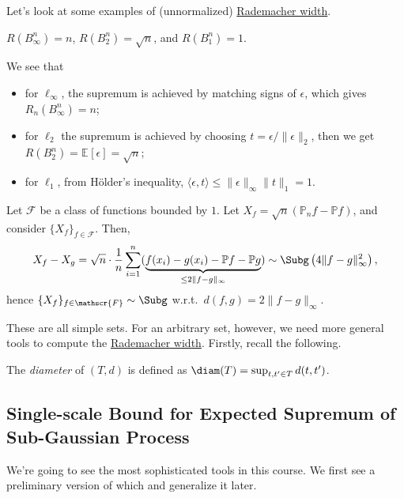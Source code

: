 Let's look at some examples of (unnormalized) \hyperref[def:Rademacher-width]{Rademacher width}.

\begin{eg}
	\(R(B_\infty ^n) = n\), \(R(B_2^n)= \sqrt{n} \), and \(R(B_1^n) = 1\).
\end{eg}
\begin{explanation}
	We see that
	\begin{itemize}
		\item for \(\ell _\infty \), the supremum is achieved by matching signs of \(\epsilon \), which gives \(R_n(B_\infty ^n) = n\);
		\item for \(\ell _2\) the supremum is achieved by choosing \(t = \epsilon / \lVert \epsilon \rVert _2\), then we get \(R(B_2^n) = \mathbb{E}_{}\left[\epsilon \right] = \sqrt{n} \);
		\item for \(\ell _1\), from Hölder's inequality, \(\langle \epsilon , t \rangle \leq \lVert \epsilon \rVert _\infty \lVert t \rVert _1 = 1\).
	\end{itemize}
\end{explanation}

\begin{eg}\label{eg:supremum-of-empirical-process}
	Let \(\mathscr{F} \) be a class of functions bounded by \(1\). Let \(X_f = \sqrt{n} (\mathbb{P} _n f - \mathbb{P} f)\), and consider \(\{ X_f \}_{f\in \mathscr{F} } \). Then,
	\[
		X_f - X_g
		= \sqrt{n} \cdot \frac{1}{n}\sum_{i=1}^{n} ( \underbrace{f(x_i) - g(x_i) - \mathbb{P} f - \mathbb{P} g }_{\leq 2 \lVert f-g \rVert _\infty })
		\sim \Subg\left( 4 \lVert f - g \rVert _\infty ^2 \right) ,
	\]
	hence \(\{ X_f \} _{f\in \mathscr{F} } \sim \Subg\) w.r.t.\ \(d(f, g) = 2\lVert f - g \rVert _\infty\).
\end{eg}

These are all simple sets. For an arbitrary set, however, we need more general tools to compute the \hyperref[def:Rademacher-width]{Rademacher width}. Firstly, recall the following.

\begin{definition}[Diameter]\label{def:diameter}
	The \emph{diameter} of \((T, d)\) is defined as \(\diam(T) = \sup _{t, t^{\prime} \in T} d(t, t^{\prime} )\).
\end{definition}

\subsection{Single-scale Bound for Expected Supremum of Sub-Gaussian Process}
We're going to see the most sophisticated tools in this course. We first see a preliminary version of which and generalize it later.

